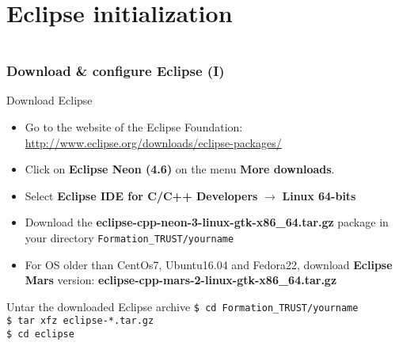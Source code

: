 \documentclass[10pt, hyperref={unicode=true,pdfusetitle, bookmarks=true,bookmarksnumbered=false,bookmarksopen=false, breaklinks=false,pdfborder={0 0 1},backref=true,colorlinks=true,linkcolor=darkblue,pageanchor, urlcolor=darkblue}]{beamer}
\begin{document}
\section{{\bf{Eclipse initialization}}}
\begin{frame}
\begin{columns}[c] 
\tableofcontents[sections={1-4},currentsection, currentsubsection]
\tableofcontents[sections={5-8},currentsection, currentsubsection]
\end{columns}
\end{frame}
\begin{frame}
\frametitle{Download \& configure Eclipse (I)}

\begin{exampleblock}{Download Eclipse}
\begin{itemize}
\item Go to the website of the Eclipse Foundation: \url{http://www.eclipse.org/downloads/eclipse-packages/}
\item Click on \textbf{Eclipse Neon (4.6)} on the menu \textbf{More downloads}.
\item Select \textbf{Eclipse IDE for C/C++ Developers} $\rightarrow$ \textbf{Linux 64-bits}
\item Download the \textbf{eclipse-cpp-neon-3-linux-gtk-x86\_64.tar.gz} package in your directory \texttt{Formation\_TRUST/yourname}
\item For OS older than CentOs7, Ubuntu16.04 and Fedora22, download \textbf{Eclipse Mars} version: \textbf{eclipse-cpp-mars-2-linux-gtk-x86\_64.tar.gz}
\end{itemize}
\end{exampleblock}

\begin{exampleblock}{Untar the downloaded Eclipse archive}
 \texttt{\$ cd Formation\_TRUST/yourname} \\
 \texttt{\$ tar xfz eclipse-*.tar.gz} \\
 \texttt{\$ cd eclipse}
\end{exampleblock}

\end{frame}
\end{document}

